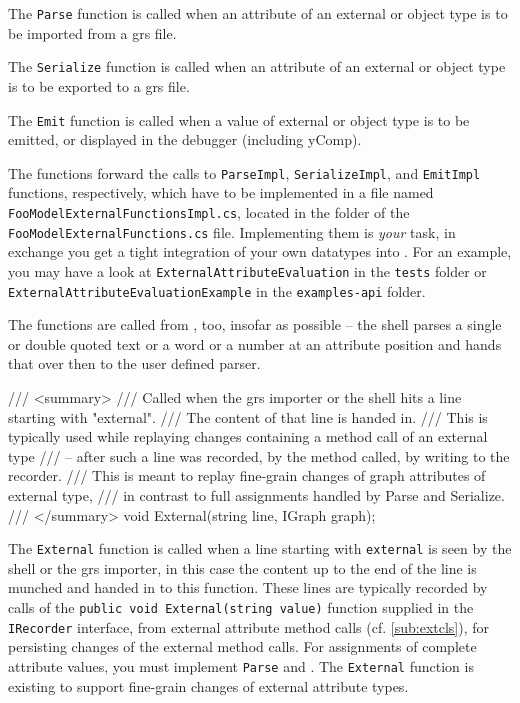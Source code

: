 \pagebreak

The \texttt{Parse} function is called when an attribute of an external or object type is to be imported from a grs file.

The \texttt{Serialize} function is called when an attribute of an external or object type is to be exported to a grs file.

The \texttt{Emit} function is called when a value of external or object type is to be emitted, or displayed in the debugger (including yComp).

The functions forward the calls to \texttt{ParseImpl}, \texttt{SerializeImpl}, and \texttt{EmitImpl} functions, respectively, which have to be implemented in a file named \texttt{Foo\-Model\-External\-Functions\-Impl.cs}, located in the folder of the \texttt{Foo\-Model\-External\-Functions.cs} file.
Implementing them is \emph{your} task, in exchange you get a tight integration of your own datatypes into \GrG.
For an example, you may have a look at \texttt{External\-Attribute\-Evaluation} in the \texttt{tests} folder or \texttt{External\-Attribute\-Evaluation\-Example} in the \texttt{examples-api} folder.

The functions are called from \GrShell, too, insofar as possible -- the shell parses a single or double quoted text or a word or a number at an attribute position and hands that over then to the user defined parser.

\begin{csharplet}
/// <summary>
/// Called when the grs importer or the shell hits a line starting with "external".
/// The content of that line is handed in.
/// This is typically used while replaying changes containing a method call of an external type
/// -- after such a line was recorded, by the method called, by writing to the recorder.
/// This is meant to replay fine-grain changes of graph attributes of external type,
/// in contrast to full assignments handled by Parse and Serialize.
/// </summary>
void External(string line, IGraph graph);
\end{csharplet}

The \texttt{External} function is called when a line starting with \texttt{external} is seen by the shell or the grs importer, in this case the content up to the end of the line is munched and handed in to this function.
These lines are typically recorded by calls of the \texttt{public void External(string value)} function supplied in the \texttt{IRecorder} interface, from external attribute method calls (cf. \ref{sub:extcls}), for persisting changes of the external method calls.
For assignments of complete attribute values, you must implement \texttt{Parse} and .
The \texttt{External} function is existing to support fine-grain changes of external attribute types.

